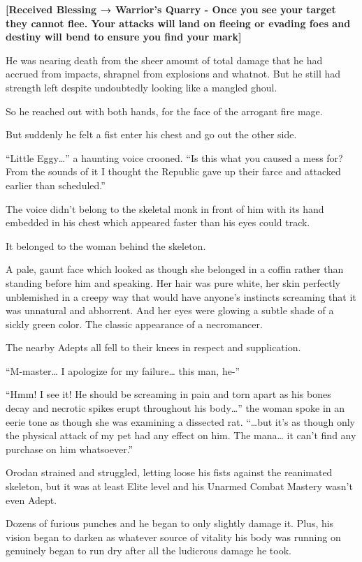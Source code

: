 \documentclass[a4paper,10pt]{book}
\begin{document}
\textbf{[Received Blessing → Warrior’s Quarry - Once you see your target they cannot flee. Your attacks will land on fleeing or evading foes and destiny will bend to ensure you find your mark]}\par
He was nearing death from the sheer amount of total damage that he had accrued from impacts, shrapnel from explosions and whatnot. But he still had strength left despite undoubtedly looking like a mangled ghoul.\par
So he reached out with both hands, for the face of the arrogant fire mage.\par
But suddenly he felt a fist enter his chest and go out the other side.\par
“Little Eggy…” a haunting voice crooned. “Is this what you caused a mess for? From the sounds of it I thought the Republic gave up their farce and attacked earlier than scheduled.”\par
The voice didn’t belong to the skeletal monk in front of him with its hand embedded in his chest which appeared faster than his eyes could track.\par
It belonged to the woman behind the skeleton.\par
A pale, gaunt face which looked as though she belonged in a coffin rather than standing before him and speaking. Her hair was pure white, her skin perfectly unblemished in a creepy way that would have anyone’s instincts screaming that it was unnatural and abhorrent. And her eyes were glowing a subtle shade of a sickly green color. The classic appearance of a necromancer.\par
The nearby Adepts all fell to their knees in respect and supplication.\par
“M-master… I apologize for my failure… this man, he-”\par
“Hmm! I see it! He should be screaming in pain and torn apart as his bones decay and necrotic spikes erupt throughout his body…” the woman spoke in an eerie tone as though she was examining a dissected rat. “…but it’s as though only the physical attack of my pet had any effect on him. The mana… it can’t find any purchase on him whatsoever.”\par
Orodan strained and struggled, letting loose his fists against the reanimated skeleton, but it was at least Elite level and his Unarmed Combat Mastery wasn’t even Adept.\par
Dozens of furious punches and he began to only slightly damage it. Plus, his vision began to darken as whatever source of vitality his body was running on genuinely began to run dry after all the ludicrous damage he took.\par
\end{document}
